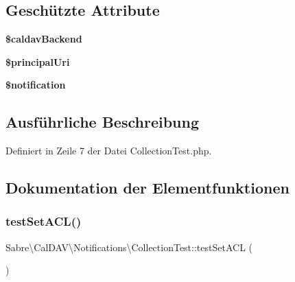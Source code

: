 \subsection*{Geschützte Attribute}
\begin{DoxyCompactItemize}
\item 
\mbox{\label{class_sabre_1_1_cal_d_a_v_1_1_notifications_1_1_collection_test_a877095f565bb39da7e31e1223f6c4766}} 
{\bfseries \$caldav\+Backend}
\item 
\mbox{\label{class_sabre_1_1_cal_d_a_v_1_1_notifications_1_1_collection_test_a7e503cf2c37c13413c5ea46253e3f3ef}} 
{\bfseries \$principal\+Uri}
\item 
\mbox{\label{class_sabre_1_1_cal_d_a_v_1_1_notifications_1_1_collection_test_afde62a86445062176a44d47dc6f83900}} 
{\bfseries \$notification}
\end{DoxyCompactItemize}


\subsection{Ausführliche Beschreibung}


Definiert in Zeile 7 der Datei Collection\+Test.\+php.



\subsection{Dokumentation der Elementfunktionen}
\mbox{\label{class_sabre_1_1_cal_d_a_v_1_1_notifications_1_1_collection_test_a5239d56672a54815989a55fefdf0cafd}} 
\subsubsection{\texorpdfstring{test\+Set\+A\+C\+L()}{testSetACL()}}
{\footnotesize\ttfamily Sabre\textbackslash{}\+Cal\+D\+A\+V\textbackslash{}\+Notifications\textbackslash{}\+Collection\+Test\+::test\+Set\+A\+CL (\begin{DoxyParamCaption}{ }\end{DoxyParamCaption})}



